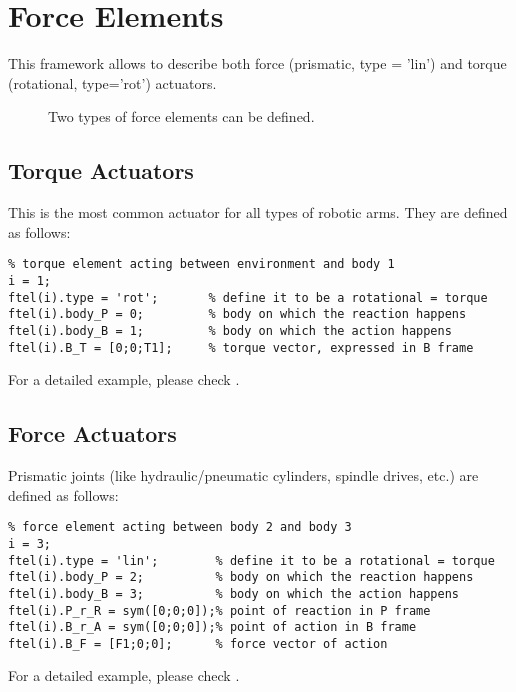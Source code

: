 \section{Force Elements}\label{sec:forceel}
This framework allows to describe both force (prismatic, type = 'lin') and torque (rotational, type='rot') actuators.  

\begin{figure}[H]
	\centering
		\qquad\qquad
		\subfigure[Force actuator acting in a prismatic joint (type = 'lin').]{\texttt{[image: ../RobotArmExample/linearJoint.pdf]}}
	\caption{Two types of force elements can be defined.}
	\label{fig:joints}
\end{figure}

\subsection{Torque Actuators} \label{sec:torqueAct}

This is the most common actuator for all types of robotic arms.  They are defined as follows:
\begin{lstlisting}
% torque element acting between environment and body 1
i = 1;
ftel(i).type = 'rot';       % define it to be a rotational = torque 
ftel(i).body_P = 0;         % body on which the reaction happens
ftel(i).body_B = 1;         % body on which the action happens
ftel(i).B_T = [0;0;T1];     % torque vector, expressed in B frame
\end{lstlisting}
For a detailed example, please check .

\subsection{Force Actuators}
Prismatic joints (like hydraulic/pneumatic cylinders, spindle drives, etc.) are defined as follows:
\begin{lstlisting}
% force element acting between body 2 and body 3
i = 3;
ftel(i).type = 'lin';        % define it to be a rotational = torque 
ftel(i).body_P = 2;          % body on which the reaction happens
ftel(i).body_B = 3;          % body on which the action happens
ftel(i).P_r_R = sym([0;0;0]);% point of reaction in P frame
ftel(i).B_r_A = sym([0;0;0]);% point of action in B frame
ftel(i).B_F = [F1;0;0];      % force vector of action 
\end{lstlisting}
For a detailed example, please check .

